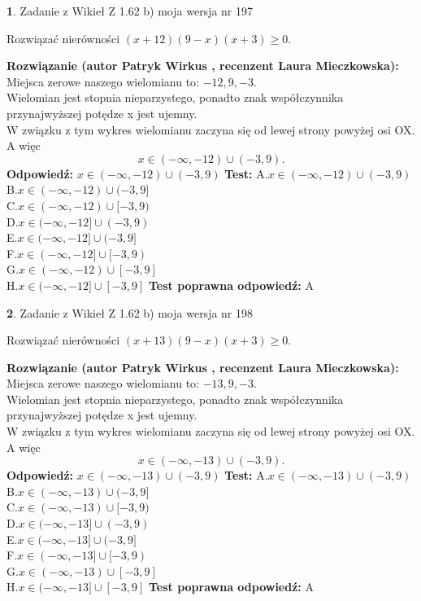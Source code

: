 \documentclass[12pt, a4paper]{article}
\theoremstyle{definition} %
\newtheorem{zad}{}
\newcommand{\zadStart}[1]{\begin{zad}#1\newline}
\newcommand{\zadStop}{\end{zad}}
\newcommand{\rozwStart}[2]{\noindent \textbf{Rozwiązanie (autor #1 , recenzent #2): }\newline}
\newcommand{\rozwStop}{\newline}
\newcommand{\odpStart}{\noindent \textbf{Odpowiedź:}\newline}
\newcommand{\odpStop}{\newline}
\newcommand{\testStart}{\noindent \textbf{Test:}\newline}
\newcommand{\testStop}{\newline}
\newcommand{\kluczStart}{\noindent \textbf{Test poprawna odpowiedź:}\newline}
\newcommand{\kluczStop}{\newline}
\begin{document}
\zadStart{Zadanie z Wikieł Z 1.62 b) moja wersja nr 197}

Rozwiązać nierówności $(x+12)(9-x)(x+3)\ge0$.
\zadStop
\rozwStart{Patryk Wirkus}{Laura Mieczkowska}
Miejsca zerowe naszego wielomianu to: $-12, 9, -3$.\\
Wielomian jest stopnia nieparzystego, ponadto znak współczynnika przy\linebreak najwyższej potędze x jest ujemny.\\ W związku z tym wykres wielomianu zaczyna się od lewej strony powyżej osi OX. A więc $$x \in (-\infty,-12) \cup (-3,9).$$
\rozwStop
\odpStart
$x \in (-\infty,-12) \cup (-3,9)$
\odpStop
\testStart
A.$x \in (-\infty,-12) \cup (-3,9)$\\
B.$x \in (-\infty,-12) \cup (-3,9]$\\
C.$x \in (-\infty,-12) \cup [-3,9)$\\
D.$x \in (-\infty,-12] \cup (-3,9)$\\
E.$x \in (-\infty,-12] \cup (-3,9]$\\
F.$x \in (-\infty,-12] \cup [-3,9)$\\
G.$x \in (-\infty,-12) \cup [-3,9]$\\
H.$x \in (-\infty,-12] \cup [-3,9]$
\testStop
\kluczStart
A
\kluczStop



\zadStart{Zadanie z Wikieł Z 1.62 b) moja wersja nr 198}

Rozwiązać nierówności $(x+13)(9-x)(x+3)\ge0$.
\zadStop
\rozwStart{Patryk Wirkus}{Laura Mieczkowska}
Miejsca zerowe naszego wielomianu to: $-13, 9, -3$.\\
Wielomian jest stopnia nieparzystego, ponadto znak współczynnika przy\linebreak najwyższej potędze x jest ujemny.\\ W związku z tym wykres wielomianu zaczyna się od lewej strony powyżej osi OX. A więc $$x \in (-\infty,-13) \cup (-3,9).$$
\rozwStop
\odpStart
$x \in (-\infty,-13) \cup (-3,9)$
\odpStop
\testStart
A.$x \in (-\infty,-13) \cup (-3,9)$\\
B.$x \in (-\infty,-13) \cup (-3,9]$\\
C.$x \in (-\infty,-13) \cup [-3,9)$\\
D.$x \in (-\infty,-13] \cup (-3,9)$\\
E.$x \in (-\infty,-13] \cup (-3,9]$\\
F.$x \in (-\infty,-13] \cup [-3,9)$\\
G.$x \in (-\infty,-13) \cup [-3,9]$\\
H.$x \in (-\infty,-13] \cup [-3,9]$
\testStop
\kluczStart
A
\kluczStop
\end{document}
